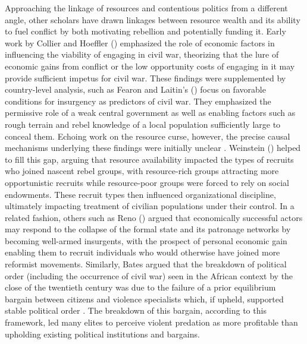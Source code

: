 Approaching the linkage of resources and contentious politics from a different angle, other scholars have drawn linkages between resource wealth and its ability to fuel conflict by both motivating rebellion and potentially funding it. Early work by Collier and Hoeffler (\citeyear{CoHo98, CoHo04}) emphasized the role of economic factors in influencing the viability of engaging in civil war, theorizing that the lure of economic gains from conflict or the low opportunity costs of engaging in it may provide sufficient impetus for civil war. These findings were supplemented by country-level analysis, such as Fearon and Laitin’s (\citeyear{FL3}) focus on favorable conditions for insurgency as predictors of civil war. They emphasized the permissive role of a weak central government as well as enabling factors such as rough terrain and rebel knowledge of a local population sufficiently large to conceal them. Echoing work on the resource curse, however, the precise causal mechanisms underlying these findings were initially unclear \cite{Humphreys05}. Weinstein (\citeyear{Weinstein07}) helped to fill this gap, arguing that resource availability impacted the types of recruits who joined nascent rebel groups, with resource-rich groups attracting more opportunistic recruits while resource-poor groups were forced to rely on social endowments. These recruit types then influenced organizational discipline, ultimately impacting treatment of civilian populations under their control. In a related fashion, others such as Reno (\citeyear{Reno02}) argued that economically successful actors may respond to the collapse of the formal state and its patronage networks by becoming well-armed insurgents, with the prospect of personal economic gain enabling them to recruit individuals who would otherwise have joined more reformist movements. Similarly, Bates argued that the breakdown of political order (including the occurrence of civil war) seen in the African context by the close of the twentieth century was due to the failure of a prior equilibrium bargain between citizens and violence specialists which, if upheld, supported stable political order \cite{BGS02, Bates08}. The breakdown of this bargain, according to this framework, led many elites to perceive violent predation as more profitable than upholding existing political institutions and bargains. 


